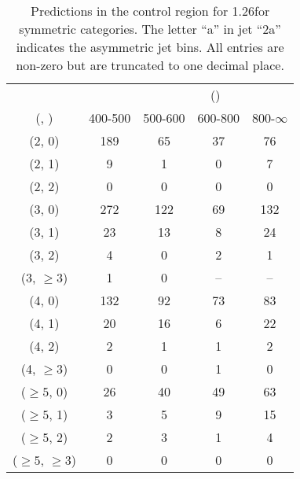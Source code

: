 \begin{table}[h!]
\tiny
\centering
\caption{Predictions in the \gj control region for 1.26\ifb for symmetric categories. The letter ``a'' in jet \eg ``2a''  indicates the asymmetric jet bins. All entries are non-zero but are truncated to one decimal place.\label{tab:predsep_gj_data_sym}}
\begin{tabular}
{ccccc}
	\hline\hline
&	& \multicolumn{4}{c}{\scalht (\gev)} \\ 
	 (\njet,  \nb) & 400-500 & 500-600 & 600-800 & 800-$\infty$ \\ [0.8ex] 
\hline
	(2, 0) & 189 & 65 & 37 & 76 \\[0.5ex] 
	(2, 1) & 9 & 1 & 0 & 7 \\[0.5ex] 
	(2, 2) & 0 & 0 & 0 & 0 \\[0.5ex] 
	(3, 0) & 272 & 122 & 69 & 132 \\[0.5ex] 
	(3, 1) & 23 & 13 & 8 & 24 \\[0.5ex] 
	(3, 2) & 4 & 0 & 2 & 1 \\[0.5ex] 
	(3, $\ge3$) & 1 & 0 & -- & -- \\[0.5ex] 
	(4, 0) & 132 & 92 & 73 & 83 \\[0.5ex] 
	(4, 1) & 20 & 16 & 6 & 22 \\[0.5ex] 
	(4, 2) & 2 & 1 & 1 & 2 \\[0.5ex] 
	(4, $\ge3$) & 0 & 0 & 1 & 0 \\[0.5ex] 
	($\ge5$, 0) & 26 & 40 & 49 & 63 \\[0.5ex] 
	($\ge5$, 1) & 3 & 5 & 9 & 15 \\[0.5ex] 
	($\ge5$, 2) & 2 & 3 & 1 & 4 \\[0.5ex] 
	($\ge5$, $\ge3$) & 0 & 0 & 0 & 0 \\[0.5ex] 
	\hline
	\hline
\end{tabular}
\end{table}
